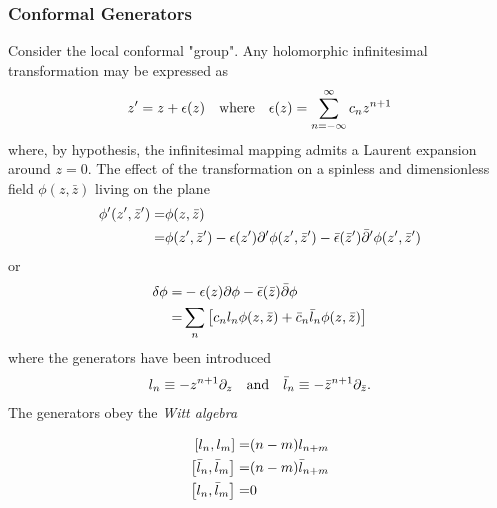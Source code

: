 \documentclass[10pt]{article}
\newenvironment{boxmath}[1]{\begin{tcolorbox}[enhanced,attach boxed title to top center={yshift=-\tcboxedtitleheight/2},boxrule=1pt,title={\centering #1},colframe=NavyBlue!70!black,colback=NavyBlue!10,colbacktitle=NavyBlue!10,fonttitle=\scshape,coltitle=Black]}{\end{tcolorbox}}
\begin{document}
\subsubsection{Conformal Generators}
Consider the local conformal "group".
Any holomorphic infinitesimal transformation may be expressed as
\begin{align}
    z'=z+\epsilon(z)\qq{where}\epsilon(z)=\sum_{n=-\infty}^{\infty}c_n z^{n+1}
\end{align}
where, by hypothesis, the infinitesimal mapping admits a Laurent expansion around $z=0$.
The effect of the transformation on a spinless and dimensionless field $\phi(z,\bar{z})$ living on the plane
\begin{align}
    \phi'(z',\bar{z}')= & \phi(z,\bar{z})\notag                                                                                             \\
    =                   & \phi(z',\bar{z}')-\epsilon(z')\partial'\phi(z',\bar{z}')-\bar{\epsilon}(\bar{z}')\bar{\partial}'\phi(z',\bar{z}')
\end{align}
or
\begin{align}
    \delta\phi= & -\epsilon(z)\partial\phi-\bar{\epsilon}(\bar{z})\bar{\partial}\phi\notag      \\
    =           & \sum_{n}\left[c_n l_n\phi(z,\bar{z})+\bar{c}_n\bar{l}_n\phi(z,\bar{z})\right]
\end{align}
where the generators have been introduced
\begin{align}
    l_n\equiv-z^{n+1}\partial_z\qq{and}\bar{l}_n\equiv-\bar{z}^{n+1}\partial_{\bar{z}}.
\end{align}
The generators obey the \textit{Witt algebra}
\begin{boxmath}{Witt algebra}
    \begin{subequations}
        \begin{align}
            \comm{l_n}{l_m}=             & (n-m)l_{n+m}       \\
            \comm{\bar{l}_n}{\bar{l}_m}= & (n-m)\bar{l}_{n+m} \\
            \comm{l_n}{\bar{l}_m}=       & 0
        \end{align}
    \end{subequations}
\end{boxmath}
\end{document}
